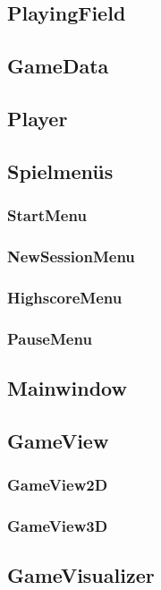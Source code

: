 \documentclass[a4paper]{scrartcl}
\begin{document}
\subsection{PlayingField}\label{PlayingField}
\subsection{GameData}\label{GameData}
\subsection{Player}\label{Player}


\subsection{Spielmenüs}\label{Spielmenüs}
\subsubsection{StartMenu}\label{StartMenu}
\subsubsection{NewSessionMenu}\label{NewSessionMenu}
\subsubsection{HighscoreMenu}\label{HighscoreMenu}
\subsubsection{PauseMenu}\label{PauseMenu}

\subsection{Mainwindow}\label{Mainwindow}
\subsection{GameView}\label{GameView}
\subsubsection{GameView2D}\label{GameView2D}
\subsubsection{GameView3D}\label{GameView3D}
\subsection{GameVisualizer}\label{GameVisualizer}
\end{document}
